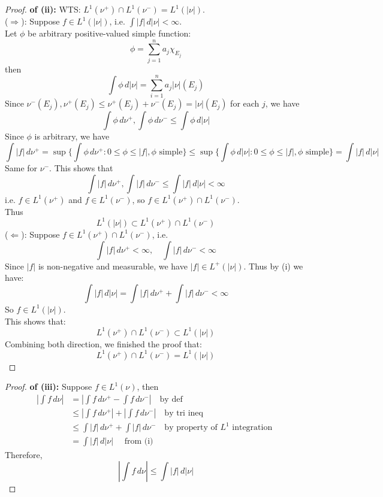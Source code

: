 \documentclass[lang=cn,11pt]{elegantbook}
\begin{document}
\begin{proof}
    \textbf{of (ii):}
    WTS: $L^1(\nu^+)\cap L^1(\nu^-)=L^1(|\nu|)$.\\
(\(\Rightarrow\)): Suppose \(f \in L^1(|\nu|)\), i.e. \(\int |f| \, d|\nu| < \infty\).  \\
Let $\phi$ be arbitrary positive-valued simple function: \[
 \phi = \sum_{j=1}^n a_j \chi_{E_j}
\]
then \[
\int \phi \, d |\nu| =  \sum_{i=1}^n a_j |\nu| (E_j)
\]
Since $\nu^-(E_j),\nu^+ (E_j) \leq   \nu^+ (E_j) + \nu^-(E_j) =   |\nu|  (E_j)$ for each $j$, we have \[
\int \phi \, d \nu^+ ,\int \phi \, d \nu^- \leq    \int \phi \, d |\nu| 
\]
Since $\phi$ is arbitrary, we have
$$\int |f| \,d \nu^+ =    \sup \{   \int \phi \,d \nu^+ : 0\leq \phi \leq |f|, \phi  \text{ simple} \}  \leq   \sup \{   \int \phi \,d |\nu| : 0\leq \phi \leq |f|, \phi  \text{ simple} \} =  \int |f| \,d |\nu|$$
Same for $\nu^-$. This shows that \[
\int |f| \, d\nu^+ , \int |f| \, d\nu^-  \leq \int |f| \, d|\nu|  < \infty
\]
i.e. $f\in L^1(\nu^+)$ and $f\in L^1(\nu^-)$, so $f\in L^1(\nu^+)\cap L^1(\nu^-)$.\\
Thus $$L^1(|\nu|) \subset   L^1(\nu^+)\cap L^1(\nu^-) $$
(\(\Leftarrow\)): Suppose \(f \in L^1(\nu^+) \cap L^1(\nu^-)\), i.e. \[
\int |f| \, d\nu^+ < \infty, \quad \int |f| \, d\nu^- < \infty
\]
Since $|f| $ is non-negative and measurable, we have $|f| \in L^+(|\nu|)$. Thus by (i) we have:
\[
\int |f| \, d|\nu| = \int |f| \, d\nu^+ + \int |f| \, d\nu^- < \infty
\]
So \(f \in L^1(|\nu|)\).\\
This shows that:  $$   L^1(\nu^+)\cap L^1(\nu^-) \subset L^1(|\nu|) $$
Combining both direction, we finished the proof that: \[
  L^1(\nu^+)\cap L^1(\nu^-)  =  L^1(|\nu|) 
\]

\end{proof}


\begin{proof}
    \textbf{of (iii):}
Suppose $f\in L^1(\nu)$, then
\begin{align*}
    \left| \int f \, d\nu \right| &= \left| \int f \, d\nu^+ - \int f \, d\nu^- \right| \quad\text{by def}\\
&\le \left| \int f \, d\nu^+ \right| + \left| \int f \, d\nu^- \right|\quad \text{by tri ineq}\\
&\le \int |f| \, d\nu^+ + \int |f| \, d\nu^-\quad \text{by property of $L^1$ integration }\\
& = \int |f| \, d|\nu| \quad\text{ from (i)}
\end{align*}
Therefore, \[
\left| \int f \, d\nu \right| \le \int |f| \, d|\nu|
\]
\end{proof}
\end{document}
